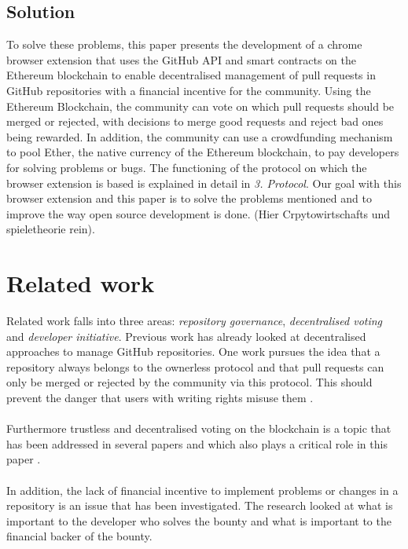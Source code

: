 \documentclass[sigconf]{acmart}
\begin{document}
\subsection{Solution}
To solve these problems, this paper presents the development of a chrome browser extension that uses the GitHub API  \cite{git2021api} and 
smart contracts \cite{eth2021contracts} on the Ethereum blockchain \cite{eth2021doc} to enable decentralised management of pull requests in GitHub repositories with a 
financial incentive for the community. Using the Ethereum Blockchain, the community can vote on which pull requests should be 
merged or rejected, with decisions to merge good requests and reject bad ones being rewarded. In addition, the community can 
use a crowdfunding mechanism to pool Ether, the native currency of the Ethereum blockchain, to pay developers for solving problems 
or bugs. The functioning of the protocol on which the browser extension is based is explained in detail in \textit{3. Protocol}. Our goal with
 this browser extension and this paper is to solve the problems mentioned and to improve the way open source development 
is done. (Hier Crpytowirtschafts und spieletheorie rein).

\section{Related work}
Related work falls into three areas: \textit{repository governance}, \textit{decentralised voting} and \textit{developer initiative}. 
Previous work has already looked at decentralised approaches to manage GitHub repositories. One work pursues the idea that 
a repository always belongs to the ownerless protocol and that pull requests can only be merged or rejected by the community 
via this protocol. This should prevent the danger that users with writing rights misuse them \cite{ulrich2020dev}. \\ \\
Furthermore trustless and decentralised voting on the blockchain is a topic that has been addressed in several papers 
and which also plays a critical role in this paper \cite{khoury2018decentralized, ulrich2020dev}. \\ \\
In addition, the lack of financial incentive to implement problems or changes in a repository is an issue that has been investigated. 
The research looked at what is important to the developer who solves the bounty and what is important to the financial backer of 
the bounty. \cite{zhou2019bounties}
\end{document}
